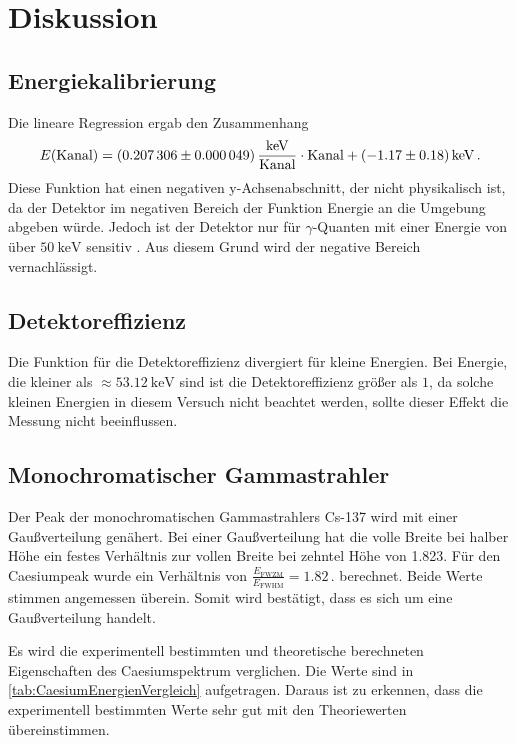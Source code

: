 \section{Diskussion}
\label{sec:Diskussion}


\subsection{Energiekalibrierung}

Die lineare Regression ergab den Zusammenhang 
\begin{equation*}
    E(\text{Kanal}) = \SI{0.207306 \pm 0.000049}{\frac{\kilo\eV}{\text{Kanal}}} \cdot \text{Kanal} + \SI{-1.17 \pm 0.18}{\kilo\eV}\,.
\end{equation*}
Diese Funktion hat einen negativen y-Achsenabschnitt, der nicht physikalisch ist, da der Detektor im negativen Bereich der Funktion Energie an die Umgebung abgeben würde.
Jedoch ist der Detektor nur für $\gamma$-Quanten mit einer Energie von über $\SI{50}{\kilo\eV}$ sensitiv \cite{v18}.
Aus diesem Grund wird der negative Bereich vernachlässigt.


\subsection{Detektoreffizienz}

Die Funktion für die Detektoreffizienz divergiert für kleine Energien.
Bei Energie, die kleiner als $\approx \SI{53.12}{\kilo\eV}$ sind ist die Detektoreffizienz größer als $1$, 
da solche kleinen Energien in diesem Versuch nicht beachtet werden, sollte dieser Effekt die Messung nicht beeinflussen.


\subsection{Monochromatischer Gammastrahler}

Der Peak der monochromatischen Gammastrahlers Cs-137 wird mit einer Gaußverteilung genähert.
Bei einer Gaußverteilung hat die volle Breite bei halber Höhe ein festes Verhältnis zur vollen Breite bei zehntel Höhe von 1.823.
Für den Caesiumpeak wurde ein Verhältnis von $\frac{E_{\text{FWZM}}}{E_{\text{FWHM}}} = 1.82\,.$ berechnet.
Beide Werte stimmen angemessen überein. Somit wird bestätigt, dass es sich um eine Gaußverteilung handelt.


Es wird die experimentell bestimmten und theoretische berechneten Eigenschaften des Caesiumspektrum verglichen.
Die Werte sind in \autoref{tab:CaesiumEnergienVergleich} aufgetragen. Daraus ist zu erkennen, dass die experimentell bestimmten Werte sehr gut mit den Theoriewerten übereinstimmen.

